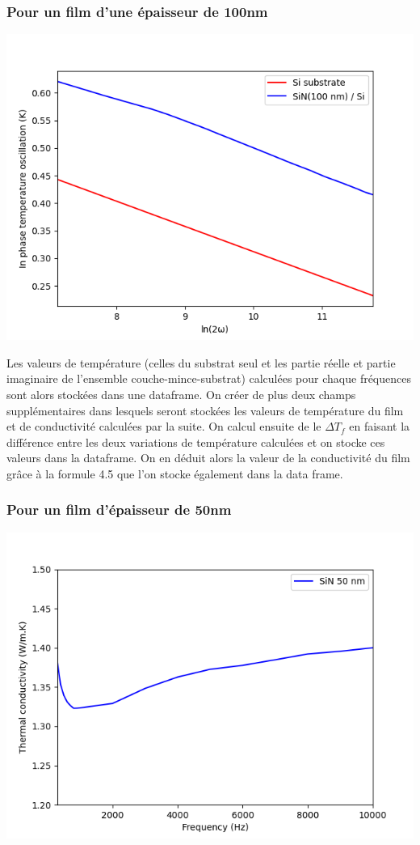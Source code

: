 \documentclass[10pt,a4paper]{report}
\begin{document}
\subsubsection{Pour un film d'une épaisseur de 100nm}
\begin{center}
\includegraphics[scale=0.7]{100nm.png} 
\end{center}
Les valeurs  de température (celles du substrat seul et les partie réelle et partie imaginaire de l'ensemble couche-mince-substrat) calculées pour chaque fréquences sont alors stockées dans une dataframe. On créer de plus deux champs supplémentaires dans lesquels seront stockées les valeurs de température du film et de conductivité calculées par la suite.
\newline
On calcul ensuite de le $\Delta T_{f}$ en faisant la différence entre les deux variations de température calculées et on stocke ces valeurs dans la dataframe. On en déduit alors la valeur de la conductivité du film grâce à la formule 4.5 que l'on stocke également dans la data frame.
\subsubsection{Pour un film d'épaisseur de 50nm}
\begin{center}
\includegraphics[scale=0.7]{kappa50nm.png} 
\end{center}
\end{document}

